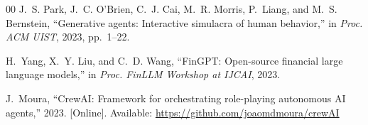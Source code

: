 \documentclass[conference]{IEEEtran}
\begin{document}
\begin{thebibliography}{00}
J.~S. Park, J.~C. O'Brien, C.~J. Cai, M.~R. Morris, P.~Liang, and M.~S. Bernstein, ``Generative agents: Interactive simulacra of human behavior,'' in \emph{Proc. ACM UIST}, 2023, pp.~1--22.

H.~Yang, X.~Y. Liu, and C.~D. Wang, ``FinGPT: Open-source financial large language models,'' in \emph{Proc. FinLLM Workshop at IJCAI}, 2023.

J.~Moura, ``CrewAI: Framework for orchestrating role-playing autonomous AI agents,'' 2023. [Online]. Available: \url{https://github.com/joaomdmoura/crewAI}

\end{thebibliography}
\end{document}
